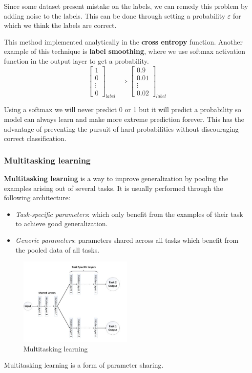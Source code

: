 Since some dataset present mistake on the labels, we can remedy this problem by
adding noise to the labels. This can be done through setting a probability $\varepsilon$
for which we think the labels are correct.

This method implemented analytically in the \textbf{cross entropy} function.
Another example of this technique is \textbf{label smoothing}, where we use
softmax activation function in the output layer to get a probability.
\begin{equation*}
    \left[\begin{array}{c}
            1 \\0\\\vdots\\ 0
        \end{array}\right]_{label} \implies \left[\begin{array}{c}
            0.9 \\0.01\\\vdots\\ 0.02
        \end{array}\right]_{label}
\end{equation*}

Using a softmax we will never predict 0 or 1 but it will predict a probability so
model can always learn and make more extreme prediction forever. This has the
advantage of preventing the pursuit of hard probabilities without discouraging
correct classification.
\subsubsection{Multitasking learning}
\textbf{Multitasking learning} is a way to improve generalization by pooling the
examples arising out of several tasks. It is usually performed through the
following architecture:
\begin{itemize}
    \item \textit{Task-specific parameters}: which only benefit from the examples
          of their task to achieve good generalization.
    \item \textit{Generic parameters}: parameters shared across all tasks which
          benefit from the pooled data of all tasks.
\end{itemize}
\begin{figure}[!ht]
    \centering
    \includegraphics[width=0.5\textwidth]{img/multitask.png}
    \caption{Multitasking learning}
    \label{fig:multitask}
\end{figure}
\begin{note}
    Multitasking learning is a form of parameter sharing.
\end{note}

